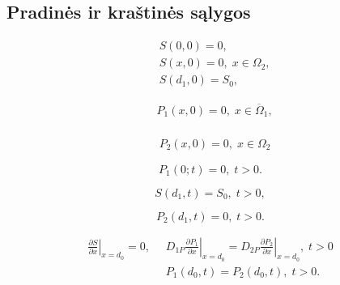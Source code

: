 \documentclass[12pt, a4paper, lithuanian]{article}
\begin{document}
\subsection{Pradinės ir kraštinės sąlygos}
\begin{equation}
\begin{aligned}
    &S(0,0) = 0, \\
    &S(x, 0) = 0,\; x \in \Omega_2,\\
    &S(d_1, 0) = S_0,
\end{aligned}
\end{equation}

\begin{equation}
\begin{aligned}
    &P_1(x, 0) = 0,\; x \in \overline\Omega_1,\\
\end{aligned}
\end{equation}

\begin{equation}
\begin{aligned}
    & P_2(x, 0) = 0,\; x \in \Omega_2%
\end{aligned}
\end{equation}

\begin{equation} 
    P_1(0;t)=0, \; t>0.
\end{equation}


\begin{equation} 
    S(d_1, t) = S_0,\; t>0,
\end{equation}

\begin{equation} 
    P_2(d_1, t) = 0,\; t>0.
\end{equation}

\begin{equation} 
\begin{aligned}
    \left. \frac{\partial S}{\partial x} \right|_{x=d_0} = 0, \;\;
    & \left. D_{1P} \frac{\partial P_1}{\partial x} \right|_{x=d_0} = 
    \left. D_{2P} \frac{\partial P_2}{\partial x} \right|_{x=d_0},\; t > 0 \\
    & P_1(d_0, t) = P_2(d_0, t),\; t>0.
\end{aligned}
\end{equation}
\end{document}
